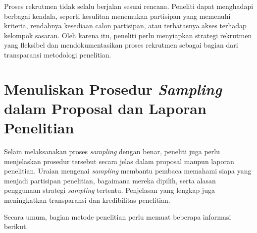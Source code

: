 \documentclass[
  indonesian,
  letterpaper,
  DIV=11,
  numbers=noendperiod]{scrreprt}
\begin{document}
Proses rekrutmen tidak selalu berjalan sesuai rencana. Peneliti dapat
menghadapi berbagai kendala, seperti kesulitan menemukan partisipan yang
memenuhi kriteria, rendahnya kesediaan calon partisipan, atau
terbatasnya akses terhadap kelompok sasaran. Oleh karena itu, peneliti
perlu menyiapkan strategi rekrutmen yang fleksibel dan mendokumentasikan
proses rekrutmen sebagai bagian dari transparansi metodologi penelitian.

\section{\texorpdfstring{Menuliskan Prosedur \emph{Sampling} dalam
Proposal dan Laporan
Penelitian}{Menuliskan Prosedur Sampling dalam Proposal dan Laporan Penelitian}}\label{menuliskan-prosedur-sampling-dalam-proposal-dan-laporan-penelitian}

Selain melaksanakan proses \emph{sampling} dengan benar, peneliti juga
perlu menjelaskan prosedur tersebut secara jelas dalam proposal maupun
laporan penelitian. Uraian mengenai \emph{sampling} membantu pembaca
memahami siapa yang menjadi partisipan penelitian, bagaimana mereka
dipilih, serta alasan penggunaan strategi \emph{sampling} tertentu.
Penjelasan yang lengkap juga meningkatkan transparansi dan kredibilitas
penelitian.

Secara umum, bagian metode penelitian perlu memuat beberapa informasi
berikut.
\end{document}
